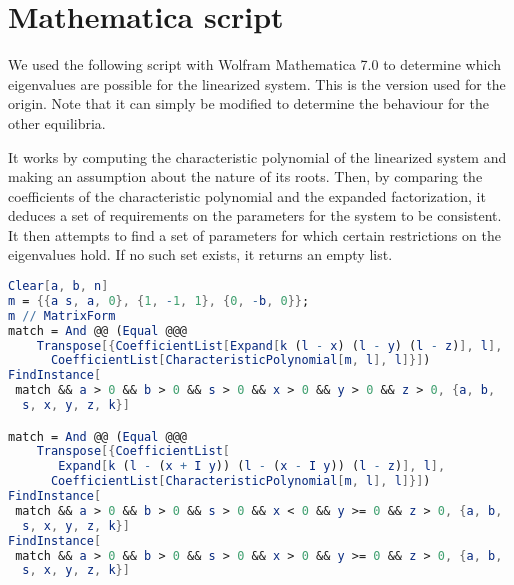 \section{Mathematica script}
\label{app:mathematica}

We used the following script with Wolfram Mathematica 7.0 to determine
which eigenvalues are possible for the linearized system.  This is the
version used for the origin.  Note that it can simply be modified to
determine the behaviour for the other equilibria.

It works by computing the characteristic polynomial of the linearized
system and making an assumption about the nature of its roots.  Then,
by comparing the coefficients of the characteristic polynomial and the
expanded factorization, it deduces a set of requirements on the
parameters for the system to be consistent.  It then attempts to find
a set of parameters for which certain restrictions on the eigenvalues
hold.  If no such set exists, it returns an empty list.

\begin{lstlisting}[language=Mathematica]
Clear[a, b, n]
m = {{a s, a, 0}, {1, -1, 1}, {0, -b, 0}};
m // MatrixForm
match = And @@ (Equal @@@ 
    Transpose[{CoefficientList[Expand[k (l - x) (l - y) (l - z)], l], 
      CoefficientList[CharacteristicPolynomial[m, l], l]}])
FindInstance[
 match && a > 0 && b > 0 && s > 0 && x > 0 && y > 0 && z > 0, {a, b, 
  s, x, y, z, k}]

match = And @@ (Equal @@@ 
    Transpose[{CoefficientList[
       Expand[k (l - (x + I y)) (l - (x - I y)) (l - z)], l], 
      CoefficientList[CharacteristicPolynomial[m, l], l]}])
FindInstance[
 match && a > 0 && b > 0 && s > 0 && x < 0 && y >= 0 && z > 0, {a, b, 
  s, x, y, z, k}]
FindInstance[
 match && a > 0 && b > 0 && s > 0 && x > 0 && y >= 0 && z > 0, {a, b, 
  s, x, y, z, k}]
\end{lstlisting}

